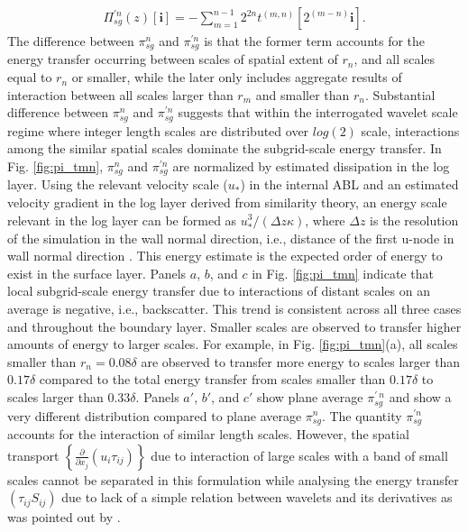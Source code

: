 \begin{align}
\Pi_{sg}^{\prime n}(z)[\mathbf{i}] = -\sum_{m=1}^{n-1}2^{2n}t^{(m,n)}[2^{(m-n)}\mathbf{i}].
\label{pi_tmn_1}
\end{align}
The difference between $\pi^{n}_{sg}$ and $\pi^{\prime n}_{sg}$ is that the former term accounts for the energy transfer occurring between scales of spatial extent of $r_n$, and all scales equal to $r_n$ or smaller, while the later only includes aggregate results of interaction between all scales larger than $r_m$ and smaller than $r_n$.  Substantial difference between $\pi^{n}_{sg}$ and $\pi^{\prime n}_{sg}$ suggests that within the interrogated wavelet scale regime where integer length scales are distributed over $log(2)$ scale, interactions among the similar spatial scales dominate the subgrid-scale energy transfer. In Fig. \ref{fig:pi_tmn}, $\pi^{n}_{sg}$ and $\pi^{\prime n}_{sg}$ are normalized by estimated dissipation in the log layer. Using the relevant velocity scale ($u_*$) in the internal ABL and an estimated velocity gradient in the log layer derived from similarity theory, an energy scale relevant in the log layer can be formed as $u^3_*/(\Delta z \kappa)$, where $\Delta z$ is the resolution of the simulation in the wall normal direction, i.e., distance of the first u-node in wall normal direction \citep{book-garrat-blm}. This energy estimate is the expected order of energy to exist in the surface layer. Panels $a$, $b$, and $c$ in Fig. \ref{fig:pi_tmn} indicate that local subgrid-scale energy transfer due to interactions of distant scales on an average is negative, i.e., backscatter. This trend is consistent across all three cases and throughout the boundary layer. Smaller scales are observed to transfer higher amounts of energy to larger scales. For example, in Fig. \ref{fig:pi_tmn}(a), all scales smaller than $r_n=0.08\delta$ are observed to transfer more energy to scales larger than $0.17\delta$ compared to the total energy transfer from scales smaller than $0.17\delta$ to scales larger than $0.33\delta$. Panels $a'$, $b'$, and $c'$ show plane average $\pi^{\prime \ n}_{sg}$ and show a very different distribution  compared to plane average $\pi^{n}_{sg}$. The quantity $\pi^{\prime n}_{sg}$ accounts for the interaction of similar length scales. However, the spatial transport $\left \{ \frac{\partial }{\partial x_j}(u_i\tau_{ij})\right \}$ due to interaction of large scales with a band of small scales cannot be separated in this formulation while analysing the energy transfer $\left ( \tau_{ij}S_{ij} \right )$  due to lack of a simple relation between wavelets and its derivatives as was pointed out by \citet{meneveau_91jfm}.

